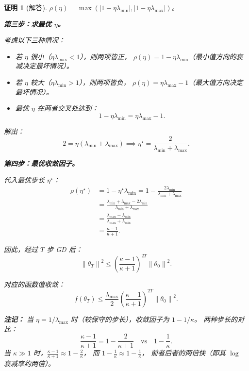 \documentclass[12pt,a4paper]{ctexart}
\theoremstyle{definition}
\theoremstyle{plain}
\newtheorem*{proof*}{证明}
\newcommand{\norm}[1]{\left\lVert #1 \right\rVert}
\begin{document}
\begin{proof*}[解答]
$\rho(\eta) = \max(|1-\eta\lambda_{\min}|, |1-\eta\lambda_{\max}|)$。

\medskip
\noindent\textbf{第三步：求最优 $\eta$。}

考虑以下三种情况：

\begin{itemize}
  \item 若 $\eta$ 很小（$\eta\lambda_{\max} < 1$），则两项皆正，
    $\rho(\eta) = 1 - \eta\lambda_{\min}$（最小值方向的衰减决定最坏情况）。
  \item 若 $\eta$ 较大（$\eta\lambda_{\min} > 1$），则两项皆负，
    $\rho(\eta) = \eta\lambda_{\max} - 1$（最大值方向决定最坏情况）。
  \item 最优 $\eta$ 在两者交叉处达到：
  \begin{equation}
    1 - \eta\lambda_{\min} = \eta\lambda_{\max} - 1.
  \end{equation}
\end{itemize}

解出：
\begin{equation}
  2 = \eta(\lambda_{\min} + \lambda_{\max})
  \implies \boxed{\eta^\star = \frac{2}{\lambda_{\min} + \lambda_{\max}}.}
\end{equation}

\medskip
\noindent\textbf{第四步：最优收敛因子。}

代入最优步长 $\eta^\star$：
\begin{equation}
  \begin{aligned}
    \rho(\eta^\star)
    &= 1 - \eta^\star \lambda_{\min}
     = 1 - \frac{2\lambda_{\min}}{\lambda_{\min} + \lambda_{\max}} \\[4pt]
    &= \frac{\lambda_{\min} + \lambda_{\max} - 2\lambda_{\min}}{\lambda_{\min} + \lambda_{\max}} \\[4pt]
    &= \frac{\lambda_{\max} - \lambda_{\min}}{\lambda_{\max} + \lambda_{\min}} \\[4pt]
    &= \boxed{\frac{\kappa - 1}{\kappa + 1}.}
  \end{aligned}
\end{equation}

因此，经过 $T$ 步 GD 后：
\begin{equation}
  \boxed{\norm{\theta_T}^2 \le \left(\frac{\kappa - 1}{\kappa + 1}\right)^{2T} \norm{\theta_0}^2.}
\end{equation}

对应的函数值收敛：
\begin{equation}
  f(\theta_T) \le \frac{\lambda_{\max}}{2} \left(\frac{\kappa - 1}{\kappa + 1}\right)^{2T} \norm{\theta_0}^2.
\end{equation}

\textbf{注记：} 当 $\eta = 1/\lambda_{\max}$ 时（较保守的步长），收敛因子为 $1 - 1/\kappa$。
两种步长的对比：
\[
  \frac{\kappa - 1}{\kappa + 1} = 1 - \frac{2}{\kappa + 1}
  \quad\text{vs}\quad
  1 - \frac{1}{\kappa}.
\]
当 $\kappa \gg 1$ 时，$\frac{\kappa-1}{\kappa+1} \approx 1 - \frac{2}{\kappa}$，
而 $1 - \frac{1}{\kappa} \approx 1 - \frac{1}{\kappa}$，
前者后者的两倍快（即其 $\log$ 衰减率约两倍）。
\end{proof*}
\end{document}
